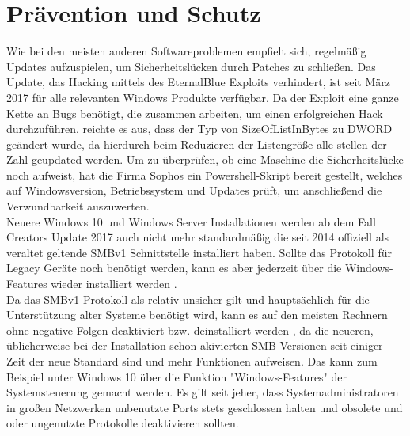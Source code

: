 \documentclass[DIV=12,headings=normal,pdftex,headinclude=false,footinclude=false,final]{scrreprt}
\begin{document}
\chapter{Prävention und Schutz}
Wie bei den meisten anderen Softwareproblemen empfielt sich, regelmäßig Updates aufzuspielen, um Sicherheitslücken durch Patches zu schließen. Das Update, das Hacking mittels des EternalBlue Exploits verhindert, ist seit März 2017 für alle relevanten Windows Produkte verfügbar.
Da der Exploit eine ganze Kette an Bugs benötigt, die zusammen arbeiten, um einen erfolgreichen Hack durchzuführen, reichte es aus, dass der Typ von SizeOfListInBytes zu DWORD geändert wurde\cite{Scad:EB}, da hierdurch beim Reduzieren der Listengröße alle stellen der Zahl geupdated werden.
Um zu überprüfen, ob eine Maschine die Sicherheitslücke noch aufweist, hat die Firma Sophos ein Powershell-Skript bereit gestellt, welches auf Windowsversion, Betriebssystem und Updates prüft, um anschließend die Verwundbarkeit auszuwerten\cite{SAV}.\\
Neuere Windows 10 und Windows Server Installationen werden ab dem Fall Creators Update 2017 auch nicht mehr standardmäßig die seit 2014 offiziell als veraltet geltende SMBv1 Schnittstelle installiert haben. Sollte das Protokoll für Legacy Geräte noch benötigt werden, kann es aber jederzeit über die Windows-Features wieder installiert werden \cite{MS:Fix}.\\
Da das SMBv1-Protokoll als relativ unsicher gilt und hauptsächlich für die Unterstützung alter Systeme benötigt wird, kann es auf den meisten Rechnern ohne negative Folgen deaktiviert bzw. deinstalliert werden \cite{WP}, da die neueren, üblicherweise bei der Installation schon akivierten SMB Versionen  seit einiger Zeit der neue Standard sind und mehr Funktionen aufweisen. Das kann zum Beispiel unter Windows 10 über die Funktion "Windows-Features" der Systemsteuerung gemacht werden. Es gilt seit jeher, dass Systemadministratoren in großen Netzwerken unbenutzte Ports stets geschlossen halten und obsolete und oder ungenutzte Protokolle deaktivieren sollten.\cite{TM:EB}
\end{document}
